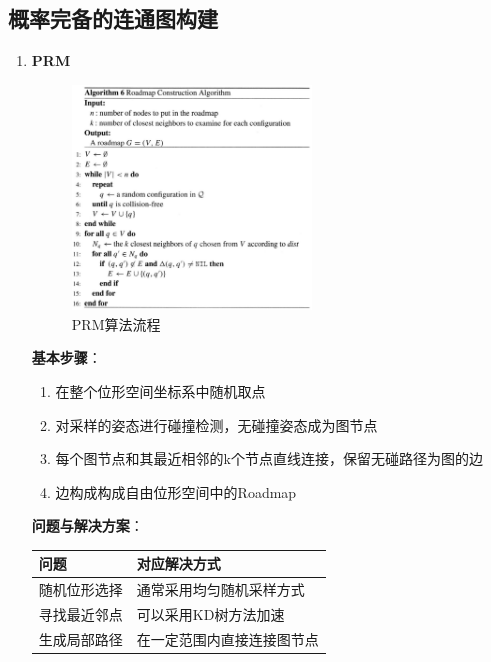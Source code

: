 \documentclass[../main.tex]{subfiles}
\begin{document}
\subsection{概率完备的连通图构建}\label{subsec:probabilistic_complete}
\begin{enumerate}
    \item \textbf{PRM}\label{item:prob:prm}
    \begin{figure}[H]
        \centering
        \includegraphics[width=0.6\textwidth]{images/prm.png}
        \caption{PRM算法流程}
    \end{figure}
    \textbf{基本步骤}：
        \begin{enumerate}
            \item 在整个位形空间坐标系中随机取点
            \item 对采样的姿态进行碰撞检测，无碰撞姿态成为图节点
            \item 每个图节点和其最近相邻的k个节点直线连接，保留无碰路径为图的边
            \item 边构成构成自由位形空间中的Roadmap
        \end{enumerate}
    \textbf{问题与解决方案}：   
        \begin{table}[H]
            \centering
            \small
            \begin{threeparttable}
            \begin{tabular}{@{}p{3cm}p{10cm}@{}}
                \toprule
                \textbf{问题} & \textbf{对应解决方式} \\
                \midrule
                随机位形选择 & 通常采用均匀随机采样方式 \\
                寻找最近邻点 & 可以采用KD树方法加速 \\
                生成局部路径 & 在一定范围内直接连接图节点 \\

\end{tabular}
\end{threeparttable}
\end{table}
\end{enumerate}
\end{document}
